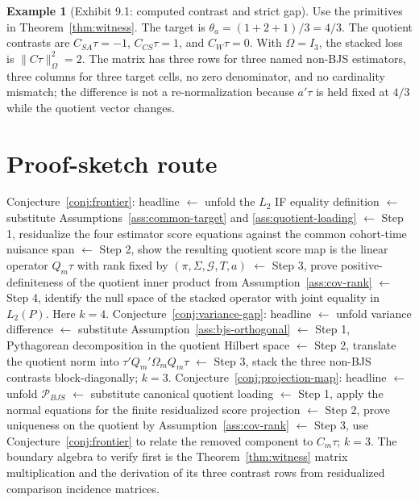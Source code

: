 \documentclass[11pt]{article}
\theoremstyle{definition}
\newtheorem{example}{Example}
\theoremstyle{plain}
\theoremstyle{remark}
\begin{document}
\begin{example}[Exhibit 9.1: computed contrast and strict gap]\label{ex:witness}
Use the primitives in Theorem~\ref{thm:witness}. The target is \(\theta_a=(1+2+1)/3=4/3\). The quotient contrasts are \(C_{SA}\tau=-1\), \(C_{CS}\tau=1\), and \(C_W\tau=0\). With \(\Omega=I_3\), the stacked loss is \(\|C\tau\|^2_\Omega=2\). The matrix has three rows for three named non-BJS estimators, three columns for three target cells, no zero denominator, and no cardinality mismatch; the difference is not a re-normalization because \(a'\tau\) is held fixed at \(4/3\) while the quotient vector changes.
\end{example}

\section{Proof-sketch route}
Conjecture~\ref{conj:frontier}: headline \(\leftarrow\) unfold the \(L_2\) IF equality definition \(\leftarrow\) substitute Assumptions~\ref{ass:common-target} and \ref{ass:quotient-loading} \(\leftarrow\) Step 1, residualize the four estimator score equations against the common cohort-time nuisance span \(\leftarrow\) Step 2, show the resulting quotient score map is the linear operator \(Q_m\tau\) with rank fixed by \((\pi,\Sigma,\mathcal G,T,a)\) \(\leftarrow\) Step 3, prove positive-definiteness of the quotient inner product from Assumption~\ref{ass:cov-rank} \(\leftarrow\) Step 4, identify the null space of the stacked operator with joint equality in \(L_2(P)\). Here \(k=4\). Conjecture~\ref{conj:variance-gap}: headline \(\leftarrow\) unfold variance difference \(\leftarrow\) substitute Assumption~\ref{ass:bjs-orthogonal} \(\leftarrow\) Step 1, Pythagorean decomposition in the quotient Hilbert space \(\leftarrow\) Step 2, translate the quotient norm into \(\tau'Q_m'\Omega_m Q_m\tau\) \(\leftarrow\) Step 3, stack the three non-BJS contrasts block-diagonally; \(k=3\). Conjecture~\ref{conj:projection-map}: headline \(\leftarrow\) unfold \(\mathcal P_{BJS}\) \(\leftarrow\) substitute canonical quotient loading \(\leftarrow\) Step 1, apply the normal equations for the finite residualized score projection \(\leftarrow\) Step 2, prove uniqueness on the quotient by Assumption~\ref{ass:cov-rank} \(\leftarrow\) Step 3, use Conjecture~\ref{conj:frontier} to relate the removed component to \(C_m\tau\); \(k=3\). The boundary algebra to verify first is the Theorem~\ref{thm:witness} matrix multiplication and the derivation of its three contrast rows from residualized comparison incidence matrices.
\end{document}
